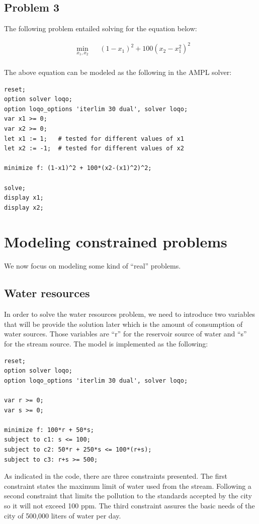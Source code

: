 \subsection{Problem 3}

The following problem entailed solving for the equation below:

\begin{equation*}
\begin{aligned}
& \underset{x_1,x_2}{\text{min}}
& & (1 - x_1)^2 + 100(x_2 - x_1^2)^2  \\ 
\end{aligned}
\end{equation*}

The above equation can be modeled as the following in the AMPL solver:

\begin{verbatim}
reset;
option solver loqo;
option loqo_options 'iterlim 30 dual', solver loqo;
var x1 >= 0;
var x2 >= 0;
let x1 := 1;   # tested for different values of x1
let x2 := -1;  # tested for different values of x2

minimize f: (1-x1)^2 + 100*(x2-(x1)^2)^2;

solve;
display x1;
display x2;
\end{verbatim}


\section{Modeling constrained problems}
We now focus on modeling some kind of “real” problems.
\subsection{Water resources}
In order to solve the water resources problem, we need to introduce two variables that will be provide the solution later which is the amount of consumption of water sources. Those variables are ``r'' for the reservoir source of water and ``s'' for the stream source. The model is implemented as the following:
\begin{verbatim}
reset;
option solver loqo;
option loqo_options 'iterlim 30 dual', solver loqo;

var r >= 0;
var s >= 0;

minimize f: 100*r + 50*s;
subject to c1: s <= 100;
subject to c2: 50*r + 250*s <= 100*(r+s);
subject to c3: r+s >= 500;
\end{verbatim}
As indicated in the code, there are three constraints presented. The first constraint states the maximum limit of water used from the stream. Following a second constraint that limits the pollution to the standards accepted by the city so it will not exceed 100 ppm. The third constraint assures the basic needs of the city of 500,000 liters of water per day.

